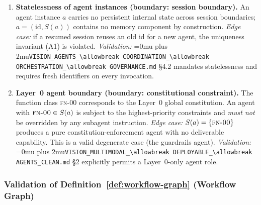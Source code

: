 \documentclass[12pt]{article}
\theoremstyle{definition}
\DeclareRobustCommand{\code}[1]{\begingroup\Urlmuskip=0mu plus 2mu\relax\nolinkurl{#1}\endgroup}
\newcommand{\FN}[1]{\textsc{fn-#1}}
\newcommand{\VisionClean}{\code{VISION\_MULTIMODAL\_\allowbreak DEPLOYABLE\_\allowbreak AGENTS\_CLEAN.md}}
\newcommand{\VisionGov}{\code{VISION\_AGENTS\_\allowbreak COORDINATION\_\allowbreak ORCHESTRATION\_\allowbreak GOVERNANCE.md}}
\begin{document}
\begin{enumerate}[label=\textbf{A\arabic*.}, leftmargin=*, widest=A9]
  \item \textbf{Statelessness of agent instances (boundary: session
        boundary).}
        An agent instance $a$ carries no persistent internal state
        across session boundaries; $a = (\mathrm{id}, S(a))$ contains
        no memory component by construction.
        \emph{Edge case:} if a resumed session reuses an old $\mathrm{id}$
        for a new agent, the uniqueness invariant (A1) is violated.
        \emph{Validation:} \VisionGov{} \S4.2 mandates statelessness and
        requires fresh identifiers on every invocation.

  \item \textbf{Layer~0 agent boundary (boundary: constitutional
        constraint).}
        The function class \FN{00} corresponds to the Layer~0 global
        constitution.  An agent with $\FN{00} \in S(a)$ is subject to
        the highest-priority constraints and \emph{must not} be
        overridden by any subagent instruction.
        \emph{Edge case:} $S(a) = \{\FN{00}\}$ produces a pure
        constitution-enforcement agent with no deliverable capability.
        This is a valid degenerate case (the guardrails agent).
        \emph{Validation:} \VisionClean{} \S2 explicitly permits a
        Layer~0-only agent role.

\end{enumerate}

\subsubsection{Validation of Definition~\ref{def:workflow-graph}
               (Workflow Graph)}
\label{sec:val-workflow}
\end{document}
